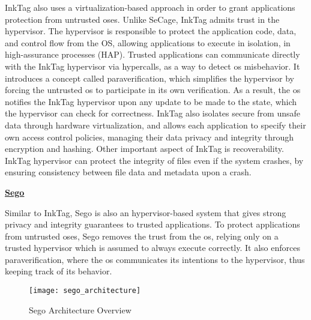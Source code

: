 InkTag \cite{inkTagPaper} also uses a virtualization-based approach in order to grant applications protection from untrusted \gls{os}es.
Unlike SeCage, InkTag admits trust in the hypervisor. The hypervisor is responsible to protect the application
code, data, and control flow from the OS, allowing applications to execute in isolation, in high-assurance processes (HAP). Trusted applications can communicate directly with the InkTag hypervisor via hypercalls, as a way to detect \gls{os} misbehavior.
It introduces a concept called paraverification, which simplifies the hypervisor by forcing the untrusted \gls{os} to participate in its own verification. As a result, the \gls{os} notifies the InkTag hypervisor upon any update to be made to the state, which the hypervisor can check for correctness. 
InkTag also isolates secure from unsafe data through hardware virtualization, and allows each application to specify their own access control policies, managing their data privacy and integrity through encryption and hashing.
Other important aspect of InkTag is recoverability. InkTag hypervisor can protect the integrity of files even if the system crashes, by ensuring consistency between file data and metadata upon a crash.\newline


\underline{\textbf{Sego}}

Similar to InkTag, Sego \cite{segoPaper} is also an hypervisor-based system that gives strong privacy and integrity guarantees to trusted applications. To protect applications from untrusted \gls{os}es, Sego removes the trust from the \gls{os}, relying only on a trusted hypervisor which is assumed to always execute correctly. It also enforces paraverification, where the \gls{os} communicates its intentions to the hypervisor, thus keeping track of its behavior.

\begin{figure}[htbp]
	\centering
	{\texttt{[image: sego\_architecture]}}
	\caption{Sego Architecture Overview}
	\label{fig:segoArchitecture}
\end{figure}


